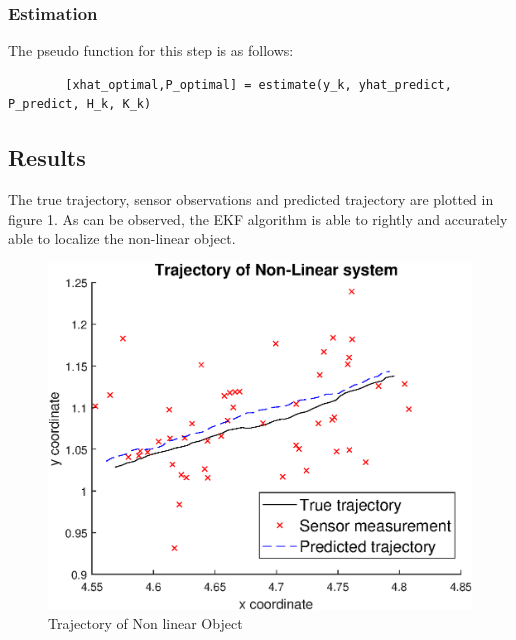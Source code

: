 \documentclass[a4paper,11pt]{article}
\theoremstyle{mytheor}
\begin{document}
\subsubsection{Estimation}
    The pseudo function for this step is as follows: 
    \begin{lstlisting}
        [xhat_optimal,P_optimal] = estimate(y_k, yhat_predict, P_predict, H_k, K_k)
    \end{lstlisting}

\subsection*{Results}
The true trajectory, sensor observations and predicted trajectory are plotted in figure 1. As can be observed, the EKF algorithm is able to rightly and accurately able to localize the non-linear object. 
\begin{figure}[h]
    \centering
    \includegraphics[scale = 1.0]{results.eps}
    \caption{Trajectory of Non linear Object}
    \label{fig:my_label}
\end{figure}
\end{document}
